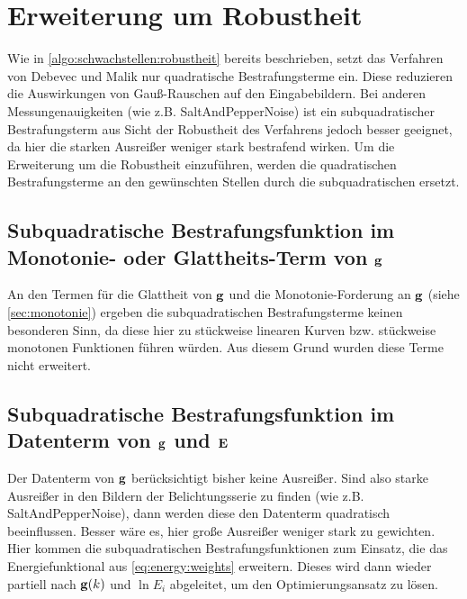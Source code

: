 \section{Erweiterung um Robustheit}
\label{sec:robustheit}

Wie in \autoref{algo:schwachstellen:robustheit} bereits beschrieben, setzt das Verfahren von Debevec und Malik nur quadratische Bestrafungsterme ein. Diese reduzieren die Auswirkungen von Gauß-Rauschen auf den Eingabebildern. Bei anderen Messungenauigkeiten (wie z.B. \gls{SaltAndPepperNoise}) ist ein subquadratischer Bestrafungsterm aus Sicht der Robustheit des Verfahrens jedoch besser geeignet, da hier die starken Ausreißer weniger stark bestrafend wirken. Um die Erweiterung um die Robustheit einzuführen, werden die quadratischen Bestrafungsterme an den gewünschten Stellen durch die subquadratischen ersetzt. 


\subsection{Subquadratische Bestrafungsfunktion im Monotonie- oder Glattheits-Term von $\mathbf g$}
An den Termen für die Glattheit von $\mathbf g$ und die Monotonie-Forderung an $\mathbf g$ (siehe \autoref{sec:monotonie}) ergeben die subquadratischen Bestrafungsterme keinen besonderen Sinn, da diese hier zu stückweise linearen Kurven bzw. stückweise monotonen Funktionen führen würden. Aus diesem Grund wurden diese Terme nicht erweitert.


\subsection{Subquadratische Bestrafungsfunktion im Datenterm von $\mathbf g$ und $\mathbf E$}
\label{subsec:robust:e:daten}

Der Datenterm von $\mathbf g$ berücksichtigt bisher keine Ausreißer. Sind also starke Ausreißer in den Bildern der Belichtungsserie zu finden (wie z.B. \gls{SaltAndPepperNoise}), dann werden diese den Datenterm quadratisch beeinflussen. Besser wäre es, hier große Ausreißer weniger stark zu gewichten.
Hier kommen die subquadratischen Bestrafungsfunktionen zum Einsatz, die das Energiefunktional aus \autoref{eq:energy:weights} erweitern. Dieses wird dann wieder partiell nach $\mathbf g(k)$ und $\ln E_i$ abgeleitet, um den Optimierungsansatz zu lösen. 

